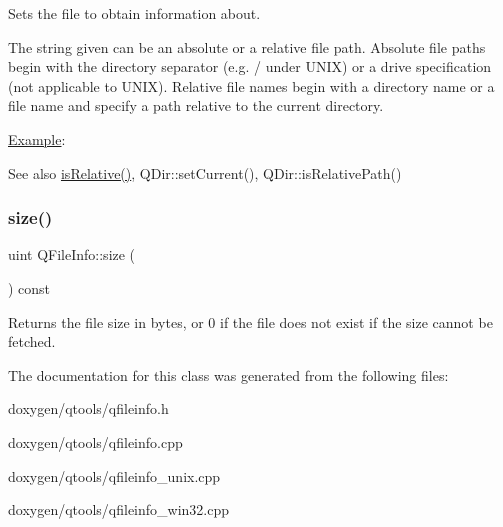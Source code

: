 Sets the file to obtain information about.

The string given can be an absolute or a relative file path. Absolute file paths begin with the directory separator (e.\+g. \textquotesingle{}/\textquotesingle{} under U\+N\+IX) or a drive specification (not applicable to U\+N\+IX). Relative file names begin with a directory name or a file name and specify a path relative to the current directory.

\mbox{\hyperlink{struct_example}{Example}}\+: 
\begin{DoxyCode}{0}
\DoxyCodeLine{\textcolor{preprocessor}{\#include <qfileinfo.h>}}
\DoxyCodeLine{\textcolor{preprocessor}{\#include <qdir.h>}}
\DoxyCodeLine{}
\DoxyCodeLine{\{}
\DoxyCodeLine{}
\DoxyCodeLine{          \textcolor{comment}{// fi1 and fi2 now point to the same file}}
\DoxyCodeLine{}
\DoxyCodeLine{          \textcolor{comment}{// fi1 now points to "/liver/aorta",}}
\DoxyCodeLine{          \textcolor{comment}{// while fi2 points to "/tmp/liver/aorta"}}
\DoxyCodeLine{\}}
\end{DoxyCode}


\begin{DoxySeeAlso}{See also}
\mbox{\hyperlink{class_q_file_info_ae1b2d0ad6ca05510092d0182e276a5d0}{is\+Relative()}}, Q\+Dir\+::set\+Current(), Q\+Dir\+::is\+Relative\+Path() 
\end{DoxySeeAlso}
\mbox{\label{class_q_file_info_a5effd75eb8571416146ac546e70cb2d7}} 
\subsubsection{\texorpdfstring{size()}{size()}}
{\footnotesize\ttfamily uint Q\+File\+Info\+::size (\begin{DoxyParamCaption}{ }\end{DoxyParamCaption}) const}

Returns the file size in bytes, or 0 if the file does not exist if the size cannot be fetched. 

The documentation for this class was generated from the following files\+:\begin{DoxyCompactItemize}
\item 
doxygen/qtools/qfileinfo.\+h\item 
doxygen/qtools/qfileinfo.\+cpp\item 
doxygen/qtools/qfileinfo\+\_\+unix.\+cpp\item 
doxygen/qtools/qfileinfo\+\_\+win32.\+cpp\end{DoxyCompactItemize}
